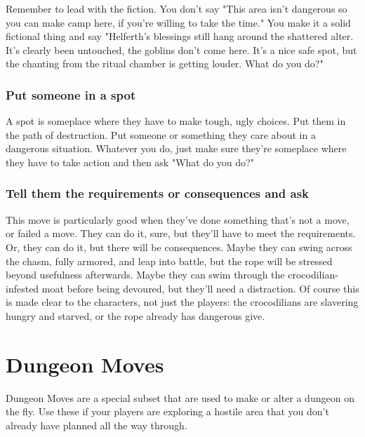  

Remember to lead with the fiction. You don't say "This area isn't dangerous so you can make camp here, if you're willing to take the time." You make it a solid fictional thing and say "Helferth's blessings still hang around the shattered alter. It's clearly been untouched, the goblins don't come here. It's a nice safe spot, but the chanting from the ritual chamber is getting louder. What do you do?"

 
\subsubsection{Put someone in a spot}    
 

A spot is someplace where they have to make tough, ugly choices. Put them in the path of destruction. Put someone or something they care about in a dangerous situation. Whatever you do, just make sure they're someplace where they have to take action and then ask "What do you do?"

 
\subsubsection{Tell them the requirements or consequences and ask}    
 

This move is particularly good when they've done something that's not a move, or failed a move. They can do it, sure, but they'll have to meet the requirements. Or, they can do it, but there will be consequences. Maybe they can swing across the chasm, fully armored, and leap into battle, but the rope will be stressed beyond usefulness afterwards. Maybe they can swim through the crocodilian-infested moat before being devoured, but they'll need a distraction. Of course this is made clear to the characters, not just the players: the crocodilians are slavering hungry and starved, or the rope already has dangerous give.

 
\section{Dungeon Moves}    
 

Dungeon Moves are a special subset that are used to make or alter a dungeon on the fly. Use these if your players are exploring a hostile area that you don't already have planned all the way through.

